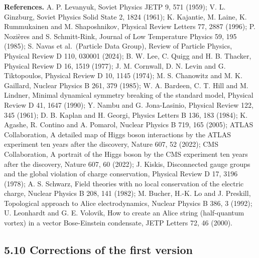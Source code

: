 \documentclass[
  10pt,
]{article}
\begin{document}
\textbf{References.} A. P. Levanyuk, Soviet Physics JETP 9, 571 (1959);
V. L. Ginzburg, Soviet Physics Solid State 2, 1824 (1961); K. Kajantie,
M. Laine, K. Rummukainen and M. Shaposhnikov, Physical Review Letters
77, 2887 (1996); P. Nozières and S. Schmitt-Rink, Journal of Low
Temperature Physics 59, 195 (1985); S. Navas et al.~(Particle Data
Group), Review of Particle Physics, Physical Review D 110, 030001
(2024); B. W. Lee, C. Quigg and H. B. Thacker, Physical Review D 16,
1519 (1977); J. M. Cornwall, D. N. Levin and G. Tiktopoulos, Physical
Review D 10, 1145 (1974); M. S. Chanowitz and M. K. Gaillard, Nuclear
Physics B 261, 379 (1985); W. A. Bardeen, C. T. Hill and M. Lindner,
Minimal dynamical symmetry breaking of the standard model, Physical
Review D 41, 1647 (1990); Y. Nambu and G. Jona-Lasinio, Physical Review
122, 345 (1961); D. B. Kaplan and H. Georgi, Physics Letters B 136, 183
(1984); K. Agashe, R. Contino and A. Pomarol, Nuclear Physics B 719, 165
(2005); ATLAS Collaboration, A detailed map of Higgs boson interactions
by the ATLAS experiment ten years after the discovery, Nature 607, 52
(2022); CMS Collaboration, A portrait of the Higgs boson by the CMS
experiment ten years after the discovery, Nature 607, 60 (2022); J.
Kiskis, Disconnected gauge groups and the global violation of charge
conservation, Physical Review D 17, 3196 (1978); A. S. Schwarz, Field
theories with no local conservation of the electric charge, Nuclear
Physics B 208, 141 (1982); M. Bucher, H.-K. Lo and J. Preskill,
Topological approach to Alice electrodynamics, Nuclear Physics B 386, 3
(1992); U. Leonhardt and G. E. Volovik, How to create an Alice string
(half-quantum vortex) in a vector Bose-Einstein condensate, JETP Letters
72, 46 (2000).

\hypertarget{corrections-of-the-first-version}{%
\subsection{5.10 Corrections of the first
version}\label{corrections-of-the-first-version}}
\end{document}
